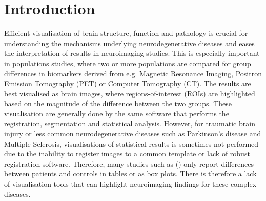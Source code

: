 \documentclass[final,times,twocolumn,authoryear]{elsarticle}
\begin{document}
\begin{frontmatter}
\begin{abstract}
\end{abstract}


\end{frontmatter}











\section{Introduction}
\label{intro}



Efficient visualisation of brain structure, function and pathology is crucial for understanding the mechanisms underlying neurodegenerative diseases and eases the interpretation of results in neuroimaging studies. This is especially important in populations studies, where two or more populations are compared for group differences in biomarkers derived from e.g. Magnetic Resonance Imaging, Positron Emission   Tomography (PET) or Computer Tomography (CT). The results are best visualised as brain images, where regions-of-interest (ROIs) are highlighted based on the magnitude of the difference between the two groups. These visualisation are generally done by the same software that performs the registration, segmentation and statistical analysis. However, for traumatic brain injury or less common neurodegenerative diseases such as Parkinson's disease and Multiple Sclerosis, visualisations of statistical results is sometimes not performed due to the inability to register images to a common template or lack of robust registration software. Therefore, many studies such as (\cite{coughlin2015neuroinflammation,schoonheim2012subcortical}) only report differences between patients and controls in tables or as box plots. There is therefore a lack of visualisation tools that can highlight neuroimaging findings for these complex diseases.
\end{document}
